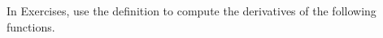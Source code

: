 \begin{exerciseset}{In Exercises}{, use the definition to compute the derivatives of the following functions.}



\end{exerciseset}
